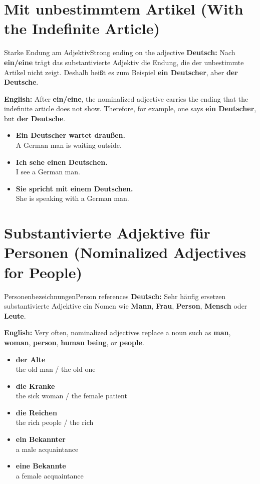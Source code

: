 \documentclass[a4paper,11pt]{article}
\newcommand{\GermanText}[1]{\textbf{Deutsch: }#1\par}
\newcommand{\EnglishText}[1]{{\small\color{SoftGray}\textbf{English: }#1\par}}
\newcommand{\ExampleItem}[2]{\item \textbf{#1}\\{\small\color{SoftGray}#2}}
\begin{document}
\section{Mit unbestimmtem Artikel \textnormal{(With the Indefinite Article)}}
\begin{grammarentry}{Starke Endung am Adjektiv}{Strong ending on the adjective}
\GermanText{Nach \textbf{ein/eine} trägt das substantivierte Adjektiv die Endung, die der unbestimmte Artikel nicht zeigt. Deshalb heißt es zum Beispiel \textbf{ein Deutscher}, aber \textbf{der Deutsche}.}
\EnglishText{After \textbf{ein/eine}, the nominalized adjective carries the ending that the indefinite article does not show. Therefore, for example, one says \textbf{ein Deutscher}, but \textbf{der Deutsche}.}
\end{grammarentry}
\begin{exbox}
\begin{itemize}
\ExampleItem{Ein \textbf{Deutscher} wartet draußen.}{A German man is waiting outside.}
\ExampleItem{Ich sehe einen \textbf{Deutschen}.}{I see a German man.}
\ExampleItem{Sie spricht mit einem \textbf{Deutschen}.}{She is speaking with a German man.}
\end{itemize}
\end{exbox}

\section{Substantivierte Adjektive für Personen \textnormal{(Nominalized Adjectives for People)}}
\begin{grammarentry}{Personenbezeichnungen}{Person references}
\GermanText{Sehr häufig ersetzen substantivierte Adjektive ein Nomen wie \textbf{Mann}, \textbf{Frau}, \textbf{Person}, \textbf{Mensch} oder \textbf{Leute}.}
\EnglishText{Very often, nominalized adjectives replace a noun such as \textbf{man}, \textbf{woman}, \textbf{person}, \textbf{human being}, or \textbf{people}.}
\end{grammarentry}
\begin{exbox}
\begin{itemize}
\ExampleItem{der \textbf{Alte}}{the old man / the old one}
\ExampleItem{die \textbf{Kranke}}{the sick woman / the female patient}
\ExampleItem{die \textbf{Reichen}}{the rich people / the rich}
\ExampleItem{ein \textbf{Bekannter}}{a male acquaintance}
\ExampleItem{eine \textbf{Bekannte}}{a female acquaintance}
\end{itemize}
\end{exbox}
\end{document}
